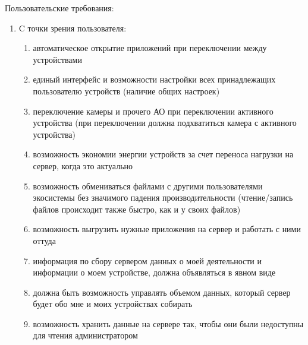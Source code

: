 Пользовательские требования:
\begin{enumerate}
   \item C точки зрения пользователя:
   \begin{enumerate}
      \item автоматическое открытие приложений при переключении между устройствами
      \item единый интерфейс и возможности настройки всех принадлежащих пользователю устройств (наличие общих настроек)
      \item переключение камеры и прочего АО при переключении активного устройства (при переключении должна подхватиться камера с активного устройства)
      \item возможность экономии энергии устройств за счет переноса нагрузки на сервер, когда это актуально
      \item возможность обмениваться файлами с другими пользователями экосистемы без значимого падения производительности (чтение/запись файлов происходит также быстро, как и у своих файлов)
      \item возможность выгрузить нужные приложения на сервер и работать с ними оттуда
      \item информация по сбору сервером данных о моей деятельности и информации о моем устройстве, должна объявляться в явном виде
      \item должна быть возможность управлять объемом данных, который сервер будет обо мне и моих устройствах собирать
      \item возможность хранить данные на сервере так, чтобы они были недоступны для чтения администратором
   \end{enumerate}


\end{enumerate}
